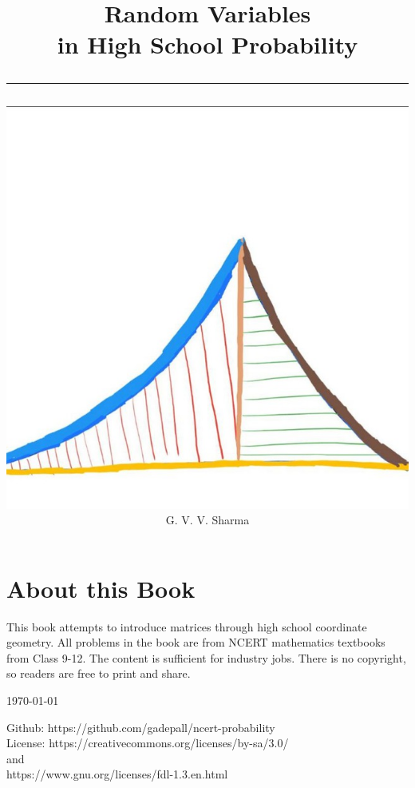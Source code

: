 \documentclass[journal,a5paper]{IEEEtran}
\begin{document}

\onecolumn


\title{
	\begin{flushleft}
	Random Variables\\ in High School Probability
	\\
\rule{0.4\columnwidth}{0.4pt}
\end{flushleft}
}
\author{
\vspace{7cm}
	\begin{flushleft}
\includegraphics[width=0.2\columnwidth]{figs/logo.jpg}
\\
		{	\huge G. V. V. Sharma}
	\end{flushleft}
}
\maketitle

\newpage

\section*{About this Book}

This book attempts to introduce matrices through high school coordinate geometry. All problems in the book are from NCERT mathematics textbooks from Class 9-12.   
The content is sufficient for industry jobs.
There is no copyright, so readers are free to print and share.  
\begin{flushright}
\today
\end{flushright}
Github: https://github.com/gadepall/ncert-probability
		\\
License: https://creativecommons.org/licenses/by-sa/3.0/
\\
and
\\
https://www.gnu.org/licenses/fdl-1.3.en.html

\newpage

\tableofcontents

\newpage
\twocolumn


\renewcommand{\thetable}{\theenumi}
\end{document}
